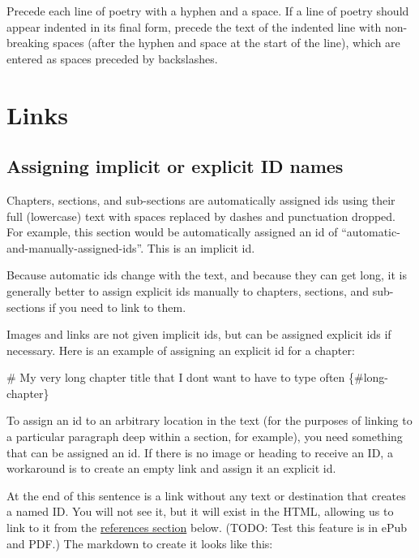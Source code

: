 \documentclass[
]{book}
\newenvironment{Shaded}{\begin{snugshade}}{\end{snugshade}}
\newcommand{\FunctionTok}[1]{\textcolor[rgb]{0.00,0.00,0.00}{#1}}
\begin{document}
Precede each line of poetry with a hyphen and a space. If a line of poetry should appear indented in its final form, precede the text of the indented line with non-breaking spaces (after the hyphen and space at the start of the line), which are entered as spaces preceded by backslashes.

\hypertarget{links}{%
\chapter{Links}\label{links}}

\hypertarget{assigning-ids}{%
\section{Assigning implicit or explicit ID names}\label{assigning-ids}}

Chapters, sections, and sub-sections are automatically assigned ids using their full (lowercase) text with spaces replaced by dashes and punctuation dropped. For example, this section would be automatically assigned an id of ``automatic-and-manually-assigned-ids''. This is an implicit id.

Because automatic ids change with the text, and because they can get long, it is generally better to assign explicit ids manually to chapters, sections, and sub-sections if you need to link to them.

Images and links are not given implicit ids, but can be assigned explicit ids if necessary. Here is an example of assigning an explicit id for a chapter:

\begin{Shaded}
\begin{Highlighting}[]
\FunctionTok{\# My very long chapter title that I don\textquotesingle{}t want to have to type often \{\#long{-}chapter\}}
\end{Highlighting}
\end{Shaded}

To assign an id to an arbitrary location in the text (for the purposes of linking to a particular paragraph deep within a section, for example), you need something that can be assigned an id. If there is no image or heading to receive an ID, a workaround is to create an empty link and assign it an explicit id.

At the end of this sentence is a link without any text or destination that creates a named ID. \protect\hypertarget{namedEmptyLink}{\href{}{}} You will not see it, but it will exist in the HTML, allowing us to link to it from the \protect\hyperlink{references}{references section} below. (TODO: Test this feature is in ePub and PDF.) The markdown to create it looks like this:
\end{document}

